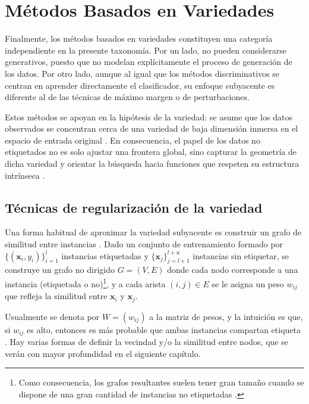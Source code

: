 \section{Métodos Basados en Variedades}
\label{sec:variedades}

Finalmente, los métodos basados en variedades constituyen una categoría independiente en la presente taxonomía. Por un lado, no pueden considerarse generativos, puesto que no modelan explícitamente el proceso de generación de los datos. Por otro lado, aunque al igual que los métodos discriminativos se centran en aprender directamente el clasificador, su enfoque subyacente es diferente al de las técnicas de máximo margen o de perturbaciones.

Estos métodos se apoyan en la hipótesis de la variedad: se asume que los datos observados se concentran cerca de una variedad de baja dimensión inmersa en el espacio de entrada original \cite{10.7551/mitpress/9780262033589.001.0001}. En consecuencia, el papel de los datos no etiquetados no es solo ajustar una frontera global, sino capturar la geometría de dicha variedad y orientar la búsqueda hacia funciones que respeten su estructura intrínseca \cite{van2020survey}.

\subsection{Técnicas de regularización de la variedad}

Una forma habitual de aproximar la variedad subyacente es construir un grafo de similitud entre instancias \cite{van2020survey}. Dado un conjunto de entrenamiento formado por $\{(\mathbf{x}_i, y_i)\}_{i=1}^l$ instancias etiquetadas y $\{\mathbf{x}_j\}_{j=l+1}^{l+u}$ instancias sin etiquetar, se construye un grafo no dirigido $G=(V,E)$ donde cada nodo corresponde a una instancia (etiquetada o no)\footnote{Como consecuencia, los grafos resultantes suelen tener gran tamaño cuando se dispone de una gran cantidad de instancias no etiquetadas \cite{zhu2009introduction}.}, y a cada arista $(i,j)\in E$ se le asigna un peso $w_{ij}$ que refleja la similitud entre $\mathbf{x}_i$ y $\mathbf{x}_j$.

Usualmente se denota por $W=(w_{ij})$ a la matriz de pesos, y la intuición es que, si $w_{ij}$ es alto, entonces es más probable que ambas instancias compartan etiqueta \cite{zhu2009introduction}. Hay varias formas de definir la vecindad y/o la similitud entre nodos, que se verán con mayor profundidad en el siguiente capítulo.

